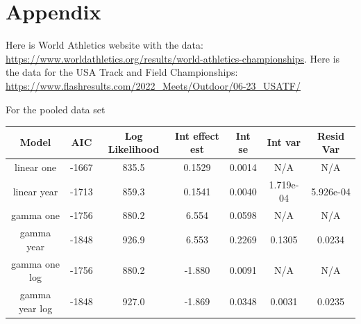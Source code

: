 \documentclass[12pt, letterpaper, titlepage]{article}
\begin{document}
\section{Appendix}
\label{sec:Appendix}
Here is World Athletics website with the data: \url{https://www.worldathletics.org/results/world-athletics-championships}.
Here is the data for the USA Track and Field Championships: \url{https://www.flashresults.com/2022_Meets/Outdoor/06-23_USATF/}

For the pooled data set
\begin{center}
  \begin{tabular}{|c  c  c  c  c  c  c |}
   \hline 
   Model & AIC & Log Likelihood & Int effect est & Int se & Int var & Resid Var \\ [0.5ex] 
   \hline\hline
   linear one & -1667 & 835.5 & 0.1529 & 0.0014 & N/A & N/A \\
   \hline
   linear year & -1713 & 859.3 & 0.1541 & 0.0040 & 1.719e-04 & 5.926e-04 \\ 
   \hline
   gamma one & -1756 & 880.2 & 6.554 & 0.0598 & N/A & N/A \\
   \hline
   gamma year & -1848 & 926.9 & 6.553 & 0.2269 & 0.1305 & 0.0234 \\
   \hline
   gamma one log & -1756 & 880.2 & -1.880 & 0.0091 & N/A & N/A \\
   \hline
   gamma year log & -1848 & 927.0 & -1.869 & 0.0348 & 0.0031 & 0.0235 \\ [0.5ex]
   \hline
  \end{tabular}
  \end{center}



\end{document}
